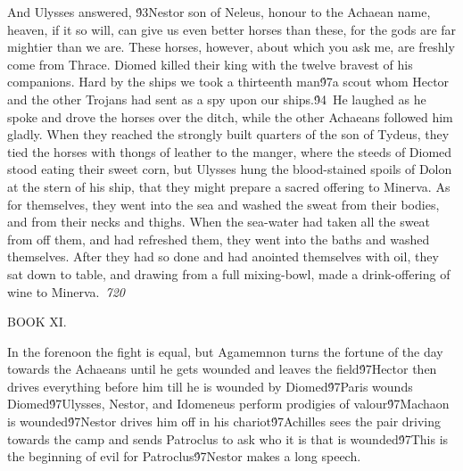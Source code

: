 {And Ulysses answered, \'93Nestor son of Neleus, honour to the Achaean name, heaven, if it so will, can give us even better horses than these, for the gods are far mightier than we are. These horses, however, about which you ask me, are freshly come from Thrace. Diomed killed their king with the twelve bravest of his companions. Hard by the ships we took a thirteenth man\'97a scout whom Hector and the other Trojans had sent as a spy upon our ships.\'94\
He laughed as he spoke and drove the horses over the ditch, while the other Achaeans followed him gladly. When they reached the strongly built quarters of the son of Tydeus, they tied the horses with thongs of leather to the manger, where the steeds of Diomed stood eating their sweet corn, but Ulysses hung the blood-stained spoils of Dolon at the stern of his ship, that they might prepare a sacred offering to Minerva. As for themselves, they went into the sea and washed the sweat from their bodies, and from their necks and thighs. When the sea-water had taken all the sweat from off them, and had refreshed them, they went into the baths and washed themselves. After they had so done and had anointed themselves with oil, they sat down to table, and drawing from a full mixing-bowl, made a drink-offering of wine to Minerva.\
\pard{}\sl720\qc{}

  BOOK XI.\
\pard\pardeftab720\qj{}

\fs25\fsmilli12800  In the forenoon the fight is equal, but Agamemnon turns the fortune of the day towards the Achaeans until he gets wounded and leaves the field\'97Hector then drives everything before him till he is wounded by Diomed\'97Paris wounds Diomed\'97Ulysses, Nestor, and Idomeneus perform prodigies of valour\'97Machaon is wounded\'97Nestor drives him off in his chariot\'97Achilles sees the pair driving towards the camp and sends Patroclus to ask who it is that is wounded\'97This is the beginning of evil for Patroclus\'97Nestor makes a long speech.\
\pard{}\qj{}

}
